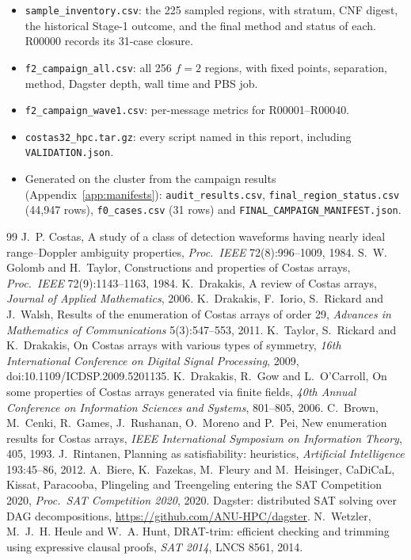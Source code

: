 \documentclass[11pt,a4paper]{article}
\theoremstyle{definition}
\newcommand{\code}[1]{\texttt{#1}}
\begin{document}
\begingroup\sloppy
\begin{itemize}
\item \code{sample\_inventory.csv}: the 225 sampled regions, with stratum, CNF digest, the
historical Stage-1 outcome, and the final method and status of each. R00000 records its 31-case
closure.
\item \code{f2\_campaign\_all.csv}: all 256 $f=2$ regions, with fixed points, separation, method,
Dagster depth, wall time and PBS job.
\item \code{f2\_campaign\_wave1.csv}: per-message metrics for R00001--R00040.
\item \code{costas32\_hpc.tar.gz}: every script named in this report, including
\code{VALIDATION.json}.
\item Generated on the cluster from the campaign results (Appendix~\ref{app:manifests}):
\code{audit\_results.csv}, \code{final\_region\_status.csv} (44{,}947 rows),
\code{f0\_cases.csv} (31 rows) and \code{FINAL\_CAMPAIGN\_MANIFEST.json}.
\end{itemize}
\endgroup

\begin{thebibliography}{99}
J.~P. Costas, A study of a class of detection waveforms having nearly ideal range--Doppler
ambiguity properties, \emph{Proc.\ IEEE} 72(8):996--1009, 1984.
S.~W. Golomb and H.~Taylor, Constructions and properties of Costas arrays, \emph{Proc.\ IEEE}
72(9):1143--1163, 1984.
K.~Drakakis, A review of Costas arrays, \emph{Journal of Applied Mathematics}, 2006.
K.~Drakakis, F.~Iorio, S.~Rickard and J.~Walsh, Results of the enumeration of Costas arrays of
order 29, \emph{Advances in Mathematics of Communications} 5(3):547--553, 2011.
K.~Taylor, S.~Rickard and K.~Drakakis, On Costas arrays with various types of symmetry,
\emph{16th International Conference on Digital Signal Processing}, 2009,
doi:10.1109/ICDSP.2009.5201135.
K.~Drakakis, R.~Gow and L.~O'Carroll, On some properties of Costas arrays generated via finite
fields, \emph{40th Annual Conference on Information Sciences and Systems}, 801--805, 2006.
C.~Brown, M.~Cenki, R.~Games, J.~Rushanan, O.~Moreno and P.~Pei, New enumeration results for
Costas arrays, \emph{IEEE International Symposium on Information Theory}, 405, 1993.
J.~Rintanen, Planning as satisfiability: heuristics, \emph{Artificial Intelligence} 193:45--86, 2012.
A.~Biere, K.~Fazekas, M.~Fleury and M.~Heisinger, CaDiCaL, Kissat, Paracooba, Plingeling and
Treengeling entering the SAT Competition 2020, \emph{Proc.\ SAT Competition 2020}, 2020.
Dagster: distributed SAT solving over DAG decompositions, \url{https://github.com/ANU-HPC/dagster}.
N.~Wetzler, M.~J.~H. Heule and W.~A. Hunt, DRAT-trim: efficient checking and trimming using
expressive clausal proofs, \emph{SAT 2014}, LNCS 8561, 2014.
\end{thebibliography}
\end{document}
